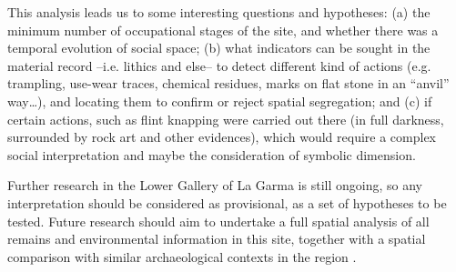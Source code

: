 
This analysis leads us to some interesting questions and hypotheses: (a) the minimum number of occupational stages of the site, and whether there was a temporal evolution of social space; (b) what indicators can be sought in the material record –i.e. lithics and else– to detect different kind of actions (e.g. trampling, use-wear traces, chemical residues, marks on flat stone in an “anvil” way…), and locating them to confirm or reject spatial segregation; and (c) if certain actions, such as flint knapping were carried out there (in full darkness, surrounded by rock art and other evidences), which would require a complex social interpretation and maybe the consideration of symbolic dimension.

Further research in the Lower Gallery of La Garma is still ongoing, so any interpretation should be considered as provisional, as a set of hypotheses to be tested. Future research should aim to undertake a full spatial analysis of all remains and environmental information in this site, together with a spatial comparison with similar archaeological contexts in the region \parencites[see][]{Arias_2005}{Arias_2009}. 

